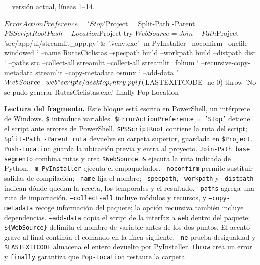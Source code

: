 \documentclass[11pt,a4paper]{article}
\begin{document}
\smallskip
{\footnotesize\texttt{} · versión actual, líneas 1--14.}\par
\begin{Codigo}[firstnumber=1]
$ErrorActionPreference = 'Stop'
$Project = Split-Path -Parent $PSScriptRoot
Push-Location $Project
try {
    $WebSource = Join-Path $Project 'src/app/ui/streamlit_app.py'
    & '.\.venv\Scripts\python.exe' -m PyInstaller --noconfirm --onefile --windowed `
        --name RutasCiclistas --specpath build --workpath build --distpath dist `
        --paths src --collect-all streamlit --collect-all streamlit_folium `
        --recursive-copy-metadata streamlit --copy-metadata osmnx `
        --add-data "${WebSource}:web" scripts/desktop_entry.py
    if ($LASTEXITCODE -ne 0) { throw 'No se pudo generar RutasCiclistas.exe.' }
} finally {
    Pop-Location
}
\end{Codigo}

\textbf{Lectura del fragmento.} Este bloque está escrito en PowerShell, un intérprete de Windows. \texttt{\$} introduce variables. \texttt{\$ErrorActionPreference = 'Stop'} detiene el script ante errores de PowerShell. \texttt{\$PSScriptRoot} contiene la ruta del script; \texttt{Split-Path -Parent ruta} devuelve su carpeta superior, guardada en \texttt{\$Project}. \texttt{Push-Location} guarda la ubicación previa y entra al proyecto. \texttt{Join-Path base segmento} combina rutas y crea \texttt{\$WebSource}. \texttt{\&} ejecuta la ruta indicada de Python. \texttt{-m PyInstaller} ejecuta el empaquetador. \texttt{--noconfirm} permite sustituir salidas de compilación; \texttt{--name} fija el nombre; \texttt{--specpath}, \texttt{--workpath} y \texttt{--distpath} indican dónde quedan la receta, los temporales y el resultado. \texttt{--paths} agrega una ruta de importación. \texttt{--collect-all} incluye módulos y recursos, y \texttt{--copy-metadata} recoge información del paquete; la opción recursiva también incluye dependencias. \texttt{--add-data} copia el script de la interfaz a \texttt{web} dentro del paquete; \texttt{\$\{WebSource\}} delimita el nombre de variable antes de los dos puntos. El acento grave al final continúa el comando en la línea siguiente. \texttt{-ne} prueba desigualdad y \texttt{\$LASTEXITCODE} almacena el entero devuelto por PyInstaller. \texttt{throw} crea un error y \texttt{finally} garantiza que \texttt{Pop-Location} restaure la carpeta.
\end{document}
